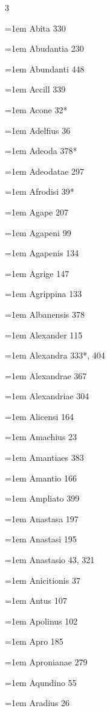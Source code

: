 \begin{multicols}{3}\footnotesize\setlength{\parindent}{0pt}\raggedright
\hangindent=1em Abita 330\par
\hangindent=1em Abudantia 230\par
\hangindent=1em Abundanti 448\par
\hangindent=1em Accill 339\par
\hangindent=1em Acone 32*\par
\hangindent=1em Adelfius 36\par
\hangindent=1em Adeoda 378*\par
\hangindent=1em Adeodatae 297\par
\hangindent=1em Afrodisi 39*\par
\hangindent=1em Agape 207\par
\hangindent=1em Agapeni 99\par
\hangindent=1em Agapenis 134\par
\hangindent=1em Agrige 147\par
\hangindent=1em Agrippina 133\par
\hangindent=1em Albanensis 378\par
\hangindent=1em Alexander 115\par
\hangindent=1em Alexandra 333*, 404\par
\hangindent=1em Alexandrae 367\par
\hangindent=1em Alexandriae 304\par
\hangindent=1em Alicensi 164\par
\hangindent=1em Amachius 23\par
\hangindent=1em Amantiaes 383\par
\hangindent=1em Amantio 166\par
\hangindent=1em Ampliato 399\par
\hangindent=1em Anastasa 197\par
\hangindent=1em Anastasi 195\par
\hangindent=1em Anastasio 43, 321\par
\hangindent=1em Anicitionis 37\par
\hangindent=1em Antus 107\par
\hangindent=1em Apolinus 102\par
\hangindent=1em Apro 185\par
\hangindent=1em Apronianae 279\par
\hangindent=1em Aqundino 55\par
\hangindent=1em Aradius 26\par

\end{multicols}
